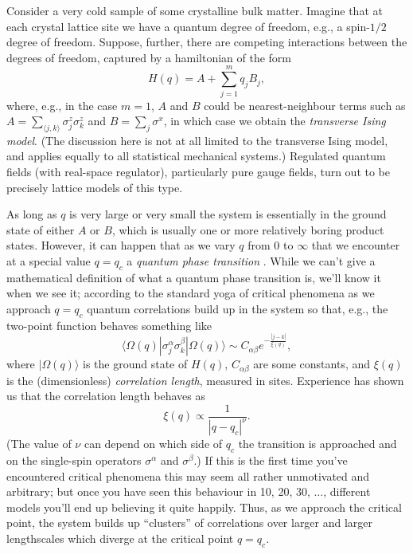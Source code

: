 \documentclass[11pt]{amsart}
\theoremstyle{plain}%
\theoremstyle{definition}
\theoremstyle{remark}
\begin{document}
Consider a very cold sample of some crystalline bulk matter. Imagine that at each crystal lattice site we have a quantum degree of freedom, e.g., a spin-$1/2$ degree of freedom. Suppose, further, there are competing interactions between the degrees of freedom, captured by a hamiltonian of the form
\begin{equation}\label{eq:latticemodel}
	H(q) = A + \sum_{j=1}^m q_j B_j,
\end{equation}
where, e.g., in the case $m=1$, $A$ and $B$ could be nearest-neighbour terms such as $A = \sum_{\langle j,k\rangle} \sigma^z_j\sigma_k^z$ and $B = \sum_{j} \sigma^x$, in which case we obtain the \emph{transverse Ising model}. (The discussion here is not at all limited to the transverse Ising model, and applies equally to all statistical mechanical systems.) Regulated quantum fields (with real-space regulator), particularly pure gauge fields, turn out to be precisely lattice models of this type. 

As long as $q$ is very large or very small the system is essentially in the ground state of either $A$ or $B$, which is usually one or more relatively boring product states. However, it can happen that as we vary $q$ from $0$ to $\infty$ that we encounter at a special value $q=q_c$ a \emph{quantum phase transition} \cite{sachdev_quantum_2011}. While we can't give a mathematical definition of what a quantum phase transition is, we'll know it when we see it; according to the standard yoga of critical phenomena as we approach $q=q_c$ quantum correlations build up in the system so that, e.g., the two-point function behaves something like
\begin{equation}\label{eq:correlator}
	\langle\Omega(q)| \sigma^\alpha_j\sigma^\beta_k|\Omega(q)\rangle \sim C_{\alpha\beta}e^{-\frac{|j-k|}{\xi(q)}},
\end{equation}
where $|\Omega(q)\rangle$ is the ground state of $H(q)$, $C_{\alpha\beta}$ are some constants, and $\xi(q)$ is the (dimensionless) \emph{correlation length}, measured in sites. Experience has shown us that the correlation length behaves as 
\begin{equation}
	\xi(q) \propto \frac{1}{|q-q_c|^\nu}.
\end{equation}
(The value of $\nu$ can depend on which side of $q_c$ the transition is approached and on the single-spin operators $\sigma^\alpha$ and $\sigma^\beta$.) If this is the first time you've encountered critical phenomena this may seem all rather unmotivated and arbitrary; but once you have seen this behaviour in 10, 20, 30, $\ldots$, different models you'll end up believing it quite happily.
Thus, as we approach the critical point, the system builds up ``clusters'' of correlations over larger and larger lengthscales which diverge at the critical point $q = q_c$. 
\end{document}

